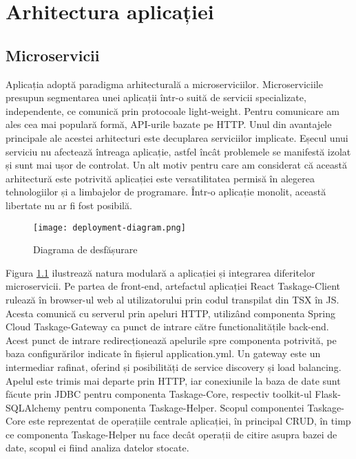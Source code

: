 \chapter{Arhitectura aplicației}

\section{Microservicii}

Aplicația adoptă paradigma arhitecturală a microserviciilor. Microserviciile presupun segmentarea unei aplicații într-o suită de servicii specializate, independente, ce comunică prin protocoale light-weight. Pentru comunicare am ales cea mai populară formă, API-urile bazate pe HTTP. Unul din avantajele principale ale acestei arhitecturi este decuplarea serviciilor implicate. Eșecul unui serviciu nu afectează întreaga aplicație, astfel încât problemele se manifestă izolat și sunt mai ușor de controlat. Un alt motiv pentru care am considerat că această arhitectură este potrivită aplicației este versatilitatea permisă în alegerea tehnologiilor și a limbajelor de programare\cite{building_microservices}.  Într-o aplicație monolit, această libertate nu ar fi fost posibilă.

 \begin{figure}[ht]
	\centering
 	 \texttt{[image: deployment-diagram.png]}
	\caption{Diagrama de desfășurare}
	\label{fig:deployment-diagram}
 \end{figure}

Figura \ref{fig:deployment-diagram} ilustrează natura modulară a aplicației și integrarea diferitelor microservicii. Pe partea de front-end, artefactul aplicației React Taskage-Client rulează în browser-ul web al utilizatorului prin codul transpilat din TSX în JS. Acesta comunică cu serverul prin apeluri HTTP, utilizând componenta Spring Cloud Taskage-Gateway ca punct de intrare către functionalitățile back-end. Acest punct de intrare redirecționează apelurile spre componenta potrivită, pe baza configurărilor indicate în fișierul application.yml. Un gateway este un intermediar rafinat, oferind și posibilități de service discovery și load balancing. Apelul este trimis mai departe prin HTTP, iar conexiunile la baza de date sunt făcute prin JDBC pentru componenta Taskage-Core, respectiv toolkit-ul Flask-SQLAlchemy pentru componenta Taskage-Helper. Scopul componentei Taskage-Core este reprezentat de operațiile centrale aplicației, în principal CRUD, în timp ce componenta Taskage-Helper nu face decât operații de citire asupra bazei de date, scopul ei fiind analiza datelor stocate.

